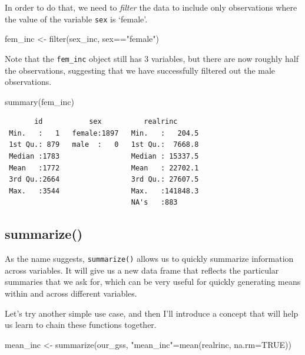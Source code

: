 \documentclass[
  letterpaper,
  DIV=11,
  numbers=noendperiod]{scrreprt}
\newenvironment{Shaded}{\begin{snugshade}}{\end{snugshade}}
\newcommand{\AttributeTok}[1]{\textcolor[rgb]{0.40,0.45,0.13}{#1}}
\newcommand{\ConstantTok}[1]{\textcolor[rgb]{0.56,0.35,0.01}{#1}}
\newcommand{\FunctionTok}[1]{\textcolor[rgb]{0.28,0.35,0.67}{#1}}
\newcommand{\NormalTok}[1]{\textcolor[rgb]{0.00,0.23,0.31}{#1}}
\newcommand{\OtherTok}[1]{\textcolor[rgb]{0.00,0.23,0.31}{#1}}
\newcommand{\SpecialCharTok}[1]{\textcolor[rgb]{0.37,0.37,0.37}{#1}}
\newcommand{\StringTok}[1]{\textcolor[rgb]{0.13,0.47,0.30}{#1}}
\begin{document}
In order to do that, we need to \emph{filter} the data to include only
observations where the value of the variable \texttt{sex} is `female'.

\begin{Shaded}
\begin{Highlighting}[]
\NormalTok{fem\_inc }\OtherTok{\textless{}{-}} \FunctionTok{filter}\NormalTok{(sex\_inc, sex}\SpecialCharTok{==}\StringTok{"female"}\NormalTok{)}
\end{Highlighting}
\end{Shaded}

Note that the \texttt{fem\_inc} object still has 3 variables, but there
are now roughly half the observations, suggesting that we have
successfully filtered out the male observations.

\begin{Shaded}
\begin{Highlighting}[]
\FunctionTok{summary}\NormalTok{(fem\_inc)}
\end{Highlighting}
\end{Shaded}

\begin{verbatim}
       id           sex          realrinc       
 Min.   :   1   female:1897   Min.   :   204.5  
 1st Qu.: 879   male  :   0   1st Qu.:  7668.8  
 Median :1783                 Median : 15337.5  
 Mean   :1772                 Mean   : 22702.1  
 3rd Qu.:2664                 3rd Qu.: 27607.5  
 Max.   :3544                 Max.   :141848.3  
                              NA's   :883       
\end{verbatim}

\subsection{summarize()}\label{summarize}

As the name suggests, \texttt{summarize()} allows us to quickly
summarize information across variables. It will give us a new data frame
that reflects the particular summaries that we ask for, which can be
very useful for quickly generating means within and across different
variables.

Let's try another simple use case, and then I'll introduce a concept
that will help us learn to chain these functions together.

\begin{Shaded}
\begin{Highlighting}[]
\NormalTok{mean\_inc }\OtherTok{\textless{}{-}} \FunctionTok{summarize}\NormalTok{(our\_gss, }\StringTok{"mean\_inc"}\OtherTok{=}\FunctionTok{mean}\NormalTok{(realrinc, }\AttributeTok{na.rm=}\ConstantTok{TRUE}\NormalTok{))}
\end{Highlighting}
\end{Shaded}
\end{document}
